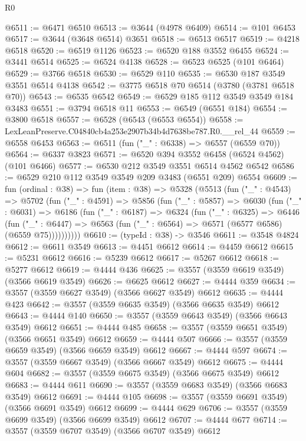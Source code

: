 \begin{lexlean}{R0}
\begin{coremodule}
@6511 := @6471 @6510
@6513 := @3644 (@4978 @6409)
@6514 := @101 @6453
@6517 := @3644 (@3648 @6514) @3651
@6518 := @6513 @6517
@6519 := @4218 @6518
@6520 := @6519 @1126
@6523 := @6520 @188 @3552 @6455
@6524 := @3441 @6514
@6525 := @6524 @4138
@6528 := @6523 @6525 (@101 @6464)
@6529 := @3766 @6518
@6530 := @6529 @110
@6535 := @6530 @187 @3549 @3551 @6514 @4138
@6542 := @3775 @6518 @70 @6514 (@3780 (@3781 @6518 @70))
@6543 := @6535 @6542
@6549 := @6529 @185 @112 @3549 @3549 @184 @3483
@6551 := @3794 @6518 @11
@6553 := @6549 (@6551 @184)
@6554 := @3800 @6518
@6557 := @6528 (@6543 (@6553 @6554))
@6558 := LexLeanPreserve.C04840cb4a253e2907b34b4d7638be787.R0.__rel_44
@6559 := @6558 @6453
@6563 := @6511 (fun ("_" : @6338) => @6557 (@6559 @70))
@6564 := @6337 @3823
@6571 := @6520 @394 @3552 @6458 (@6524 @4562) (@101 @6466)
@6577 := @6530 @212 @3549 @3551 @6514 @4562 @6542
@6586 := @6529 @210 @112 @3549 @3549 @209 @3483 (@6551 @209) @6554
@6609 := fun (ordinal : @38) =>
  fun (item : @38) =>
  @5328
    (@5513
      (fun ("_" : @4543) =>
      @5702
        (fun ("_" : @4591) =>
        @5856
          (fun ("_" : @5857) =>
          @6030
            (fun ("_" : @6031) =>
            @6186
              (fun ("_" : @6187) =>
              @6324
                (fun ("_" : @6325) =>
                @6446
                  (fun ("_" : @6447) =>
                  @6563 (fun ("_" : @6564) => @6571 (@6577 @6586) (@6559 @75))))))))))
@6610 := (typeId : @38) -> @3546
@6611 := @3548 @4824
@6612 := @6611 @3549
@6613 := @4451 @6612
@6614 := @4459 @6612
@6615 := @5231 @6612
@6616 := @5239 @6612
@6617 := @5267 @6612
@6618 := @5277 @6612
@6619 := @4444 @436
@6625 := @3557 (@3559 @6619 @3549) (@3566 @6619 @3549)
@6626 := @6625 @6612
@6627 := @4444 @359
@6634 := @3557 (@3559 @6627 @3549) (@3566 @6627 @3549) @6612
@6635 := @4444 @423
@6642 := @3557 (@3559 @6635 @3549) (@3566 @6635 @3549) @6612
@6643 := @4444 @140
@6650 := @3557 (@3559 @6643 @3549) (@3566 @6643 @3549) @6612
@6651 := @4444 @485
@6658 := @3557 (@3559 @6651 @3549) (@3566 @6651 @3549) @6612
@6659 := @4444 @507
@6666 := @3557 (@3559 @6659 @3549) (@3566 @6659 @3549) @6612
@6667 := @4444 @597
@6674 := @3557 (@3559 @6667 @3549) (@3566 @6667 @3549) @6612
@6675 := @4444 @604
@6682 := @3557 (@3559 @6675 @3549) (@3566 @6675 @3549) @6612
@6683 := @4444 @611
@6690 := @3557 (@3559 @6683 @3549) (@3566 @6683 @3549) @6612
@6691 := @4444 @105
@6698 := @3557 (@3559 @6691 @3549) (@3566 @6691 @3549) @6612
@6699 := @4444 @629
@6706 := @3557 (@3559 @6699 @3549) (@3566 @6699 @3549) @6612
@6707 := @4444 @677
@6714 := @3557 (@3559 @6707 @3549) (@3566 @6707 @3549) @6612

\end{coremodule}
\end{lexlean}
